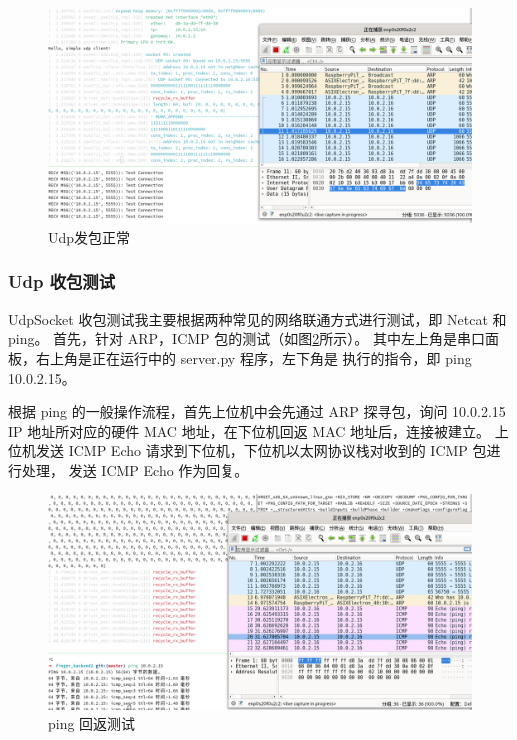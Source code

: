     \begin{figure}[ht]
        \centering
        \includegraphics[width=\textwidth]{./imgs/测试-udp发包正常.png}
        \caption{Udp发包正常}    \label{test::Udp发包}
    \end{figure}   

    \subsubsection{Udp 收包测试}

    UdpSocket 收包测试我主要根据两种常见的网络联通方式进行测试，即 Netcat 和 ping。
    首先，针对 ARP，ICMP 包的测试（如图\ref{test::pingICMP回返测试}所示）。
    其中左上角是串口面板，右上角是正在运行中的 server.py 程序，左下角是
    执行的指令，即 ping 10.0.2.15。
    
    根据 ping 的一般操作流程，首先上位机中会先通过 ARP 探寻包，询问 10.0.2.15
    IP 地址所对应的硬件 MAC 地址，在下位机回返 MAC 地址后，连接被建立。
    上位机发送 ICMP Echo 请求到下位机，下位机以太网协议栈对收到的 ICMP 包进行处理，
    发送 ICMP Echo 作为回复。

    \begin{figure}[ht]
        \centering
        \includegraphics[width=\textwidth]{./imgs/测试-pingICMP回返测试.png}
        \caption{ping 回返测试}    \label{test::pingICMP回返测试}
    \end{figure}   

